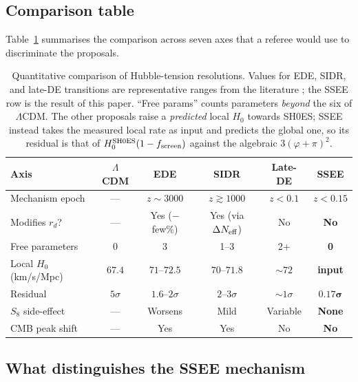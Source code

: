 \documentclass[12pt,a4paper]{article}
\newcommand{\phiG}{\varphi}
\newcommand{\fsc}{f_{\mathrm{screen}}}
\begin{document}
\subsection{Comparison table}
\label{sec:comptable}

Table~\ref{tab:comparison} summarises the comparison across seven axes that a
referee would use to discriminate the proposals.

\begin{table}[ht]
\centering
\footnotesize
\caption{Quantitative comparison of Hubble-tension resolutions.  Values for
EDE, SIDR, and late-DE transitions are representative ranges from the
literature \citep{Poulin2019,Smith2020,Hill2020,Kreisch2020,Aloni2022,Schoneberg2022};
the SSEE row is the result of this paper.  ``Free params'' counts parameters
\emph{beyond} the six of $\Lambda$CDM.  The other proposals raise a
\emph{predicted} local $H_0$ towards SH0ES; SSEE instead takes the measured
local rate as input and predicts the global one, so its residual is that of
$H_0^{\rm SH0ES}(1-\fsc)$ against the algebraic $3(\phiG+\pi)^2$.}
\label{tab:comparison}
\begin{tabular}{lccccc}
\toprule
Axis & $\Lambda$CDM & EDE & SIDR & Late-DE & \textbf{SSEE} \\
\midrule
Mechanism epoch        & ---       & $z\sim 3000$ & $z\gtrsim 1000$ & $z<0.1$ & $z<0.15$ \\
Modifies $r_d$?        & ---       & Yes ($-$few\%) & Yes (via $\Delta N_{\rm eff}$) & No & \textbf{No} \\
Free parameters        & 0         & 3            & 1--3            & 2+      & \textbf{0} \\
Local $H_0$ (km/s/Mpc) & $67.4$    & $71$--$72.5$ & $70$--$71.8$    & $\sim 72$ & \textbf{input} \\
Residual                & $5\sigma$ & $1.6$--$2\sigma$ & $2$--$3\sigma$ & $\sim 1\sigma$ & $\mathbf{0.17\sigma}$ \\
$S_8$ side-effect      & ---       & Worsens      & Mild            & Variable & \textbf{None} \\
CMB peak shift         & ---       & Yes          & Yes             & No       & \textbf{No} \\
\bottomrule
\end{tabular}
\end{table}

\subsection{What distinguishes the SSEE mechanism}
\label{sec:distinctive}
\end{document}
